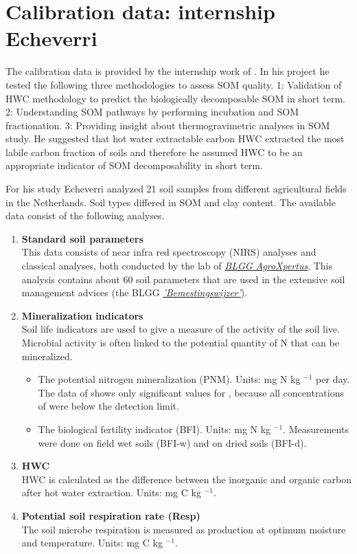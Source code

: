 \documentclass[10pt,twoside,dutch,english]{report}
\begin{document}
\section{Calibration data: internship Echeverri}
The calibration data is provided by the internship work of  \citet{Echeverri2014}. In his project he tested the following three methodologies to assess SOM quality. 1: Validation of  HWC methodology to predict the biologically decomposable SOM in short term. 2: Understanding SOM pathways by performing incubation and SOM fractionation. 3: Providing insight about thermogravimetric analyses in SOM study.  He suggested that hot water extractable carbon HWC extracted the most labile carbon fraction of soils and therefore he assumed HWC to be an appropriate indicator of SOM decomposability in short term.

For his study Echeverri analyzed 21 soil samples from different agricultural fields in the Netherlands. Soil types differed in SOM and clay content. 
The available data consist of the following analyses. 

	\begin{enumerate}
	\item \textbf{Standard soil parameters} \\
	This data consists of near infra red spectroscopy (NIRS) analyses and classical analyses, both conducted by the lab of \href{http://blgg.agroxpertus.nl/}{\textit{BLGG AgroXpertus}}. This analysis contains about 60 soil parameters that are used in the extensive soil management advices (the BLGG \href{http://blgg.agroxpertus.nl/product/bemesting/bemestingswijzer-bouwland}{\textit{'Bemestingswijzer'}}). 
	
	\item \textbf{Mineralization indicators}\\
	Soil life indicators are used to give a measure of the activity of the soil live. Microbial activity is often linked to the potential quantity of N that can be mineralized. 
	\begin{itemize}
		\item The potential nitrogen mineralization (PNM).  Units: mg N kg $^{-1}$ per day. The data of \citep{Echeverri2014} shows only significant values for , because all concentrations of  were below the detection limit. 
		\item The biological fertility indicator (BFI). Units: mg N kg $^{-1}$. Measurements were done on field wet soils (BFI-w) and on dried soils (BFI-d). 
	\end{itemize}
	
	\item \textbf{HWC} \\
	HWC is calculated as the difference between the inorganic and organic carbon after hot water extraction. Units: mg C kg $^{-1}$.   
	
	\item \textbf{Potential soil respiration rate (Resp)}\\
	The soil microbe respiration is measured as  production at optimum moisture and temperature. Units: mg C kg $^{-1}$.   
\end{enumerate}
\end{document}
